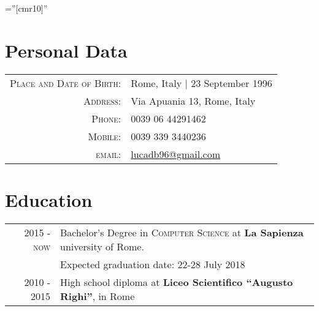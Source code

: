 \documentclass[a4paper,10pt]{article} %
\begin{document}
\pagestyle{empty} %

\font\fb=''[cmr10]'' %

\bigskip
\bigskip

\par{\bigskip\par} %

\section{Personal Data}

\begin{tabular}{rl}
\textsc{Place and Date of Birth:} & Rome, Italy  | 23 September 1996 \\
\textsc{Address:} & Via Apuania 13, Rome, Italy \\
\textsc{Phone:} & 0039 06 44291462\\
\textsc{Mobile:} & 0039 339 3440236\\
\textsc{email:} & \href{lucadb96@gmail.com}{lucadb96@gmail.com}
\end{tabular}

\bigskip

\section{Education}
\begin{tabular}{rl}
\textsc{2015 - now} & Bachelor's Degree in \textsc{Computer Science} at \textbf{La Sapienza} university of Rome.\\
&Expected graduation date: 22-28 July 2018\\
\textsc{2010 - 2015} & High school diploma at \textbf{Liceo Scientifico ``Augusto Righi''}, in Rome
\end{tabular}

\bigskip
\end{document}
